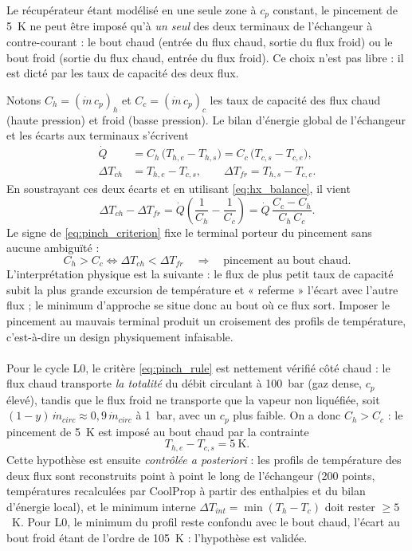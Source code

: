 Le récupérateur étant modélisé en une seule zone à $c_p$ constant, le
pincement de 5~K ne peut être imposé qu'à \emph{un seul} des deux terminaux
de l'échangeur à contre-courant : le bout chaud (entrée du flux chaud,
sortie du flux froid) ou le bout froid (sortie du flux chaud, entrée du flux
froid). Ce choix n'est pas libre : il est dicté par les taux de capacité des
deux flux.

Notons $C_h = (\dot m\, c_p)_h$ et $C_c = (\dot m\, c_p)_c$ les taux de
capacité des flux chaud (haute pression) et froid (basse pression). Le bilan
d'énergie global de l'échangeur et les écarts aux terminaux s'écrivent
\begin{align}
  \dot Q &= C_h\,\bigl(T_{h,e} - T_{h,s}\bigr)
         = C_c\,\bigl(T_{c,s} - T_{c,e}\bigr), \label{eq:hx_balance}\\
  \Delta T_{ch} &= T_{h,e} - T_{c,s},
  \qquad
  \Delta T_{fr} = T_{h,s} - T_{c,e}. \label{eq:hx_ends}
\end{align}
En soustrayant ces deux écarts et en utilisant \eqref{eq:hx_balance}, il
vient
\begin{equation}
  \Delta T_{ch} - \Delta T_{fr}
  = \dot Q \left( \frac{1}{C_h} - \frac{1}{C_c} \right)
  = \dot Q\,\frac{C_c - C_h}{C_h\, C_c} .
  \label{eq:pinch_criterion}
\end{equation}
Le signe de \eqref{eq:pinch_criterion} fixe le terminal porteur du pincement
sans aucune ambiguïté :
\begin{equation}
  C_h > C_c \iff \Delta T_{ch} < \Delta T_{fr}
  \quad\Longrightarrow\quad \text{pincement au bout chaud.}
  \label{eq:pinch_rule}
\end{equation}
L'interprétation physique est la suivante : le flux de plus petit taux de
capacité subit la plus grande excursion de température et « referme » l'écart
avec l'autre flux ; le minimum d'approche se situe donc au bout où ce flux
sort. Imposer le pincement au mauvais terminal produit un croisement des
profils de température, c'est-à-dire un design physiquement infaisable.
\\
\\
Pour le cycle L0, le critère \eqref{eq:pinch_rule} est nettement vérifié côté
chaud : le flux chaud transporte \emph{la totalité} du débit circulant à
100~bar (gaz dense, $c_p$ élevé), tandis que le flux froid ne transporte que
la vapeur non liquéfiée, soit $(1-y)\,\dot m_{circ} \approx
0{,}9\,\dot m_{circ}$ à 1~bar, avec un $c_p$ plus faible. On a donc $C_h >
C_c$ : le pincement de 5~K est imposé au bout chaud par la contrainte
\begin{equation}
  T_{h,e} - T_{c,s} = 5~\text{K} .
  \label{eq:pinch_constraint}
\end{equation}
Cette hypothèse est ensuite \emph{contrôlée a posteriori} : les profils de
température des deux flux sont reconstruits point à point le long de
l'échangeur (200 points, températures recalculées par CoolProp à partir des
enthalpies et du bilan d'énergie local), et le minimum interne
$\Delta T_{int} = \min (T_h - T_c)$ doit rester $\geq 5$~K. Pour L0, le
minimum du profil reste confondu avec le bout chaud, l'écart au bout froid
étant de l'ordre de 105~K : l'hypothèse est validée.

